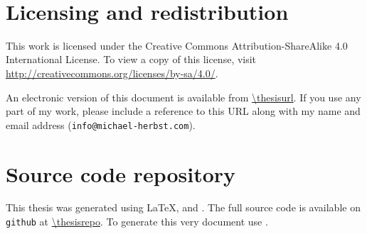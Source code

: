 \clearpage
\ifodd\value{page}\hbox{}\newpage\fi

\thispagestyle{plain}
\
\vfill
\section*{Licensing and redistribution}
{}

This work is licensed under the Creative Commons Attribution-ShareAlike 4.0
International License.
To view a copy of this license,
visit \url{http://creativecommons.org/licenses/by-sa/4.0/}.
\begin{center}
\end{center}
An electronic version of this document is available from
\url{\thesisurl}.
If you use any part of my work,
please include a reference to this URL along with my name and email address
(\texttt{info@michael-herbst.com}).

\section*{Source code repository}
{}
This thesis was generated using \LaTeX, \python and \molsturm.
The full source code is available
on \texttt{github} at \url{\thesisrepo}.
To generate this very document use \gitcurrent.
